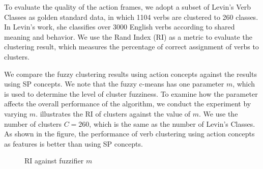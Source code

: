 

To evaluate the quality of the action frames,
we adopt a subset of Levin's Verb Classes as golden standard data,
in which 1104 verbs are clustered to 260 classes. In Levin's work\cite{1415692}, she classifies
over 3000 English verbs according to shared meaning and behavior.
We use the Rand Index (RI)\cite{1961008} as a metric to evaluate
the clustering result, which measures the percentage of correct
assignment of verbs to clusters.

We compare the fuzzy clustering results using action concepts against the results using
SP concepts.
We note that the fuzzy c-means has one parameter $m$, which is used to determine the level of cluster fuzziness.
To examine how the parameter affects the overall performance of the algorithm,
we conduct the experiment by varying $m$.
 illustrates the RI of clusters against the value of $m$.
We use the number of clusters $C=260$, which is the same as the number of
Levin's Classes.
As shown in the figure, the performance of verb clustering
using action concepts as features is better than using SP concepts.
\begin{figure}[th]
\centering
{}
\caption{RI against fuzzifier $m$}
\label{fig:cluster}
\end{figure}
